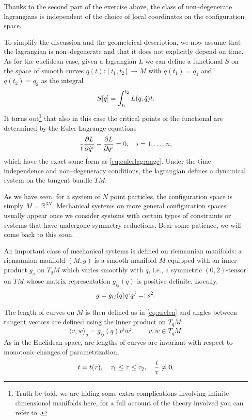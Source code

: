 \documentclass[english,fontsize=11pt,paper=a5,oneside]{scrbook}
\newcommand{\R}{\mathbb{R}}
\newcommand{\lag}{\langle}
\newcommand{\rag}{\rangle}
\let\d\relax
\DeclareMathOperator{\d}{d}
\theoremstyle{definition}
\begin{document}
Thanks to the second part of the exercise above, the class of non--degenerate lagrangians is  independent of the choice of local coordinates on the configuration space.

To simplify the discussion and the geometrical description, we now assume that the lagrangian is non--degenerate and that it does not explicitly depend on time.
As for the euclidean case, given a lagrangian $L$ we can define a functional $S$ on the space of smooth curves $q(t): [t_1,t_2] \to M$ with $q(t_1) = q_1$ and $q(t_2) = q_2$ as the integral
\begin{equation}
    S[q] = \int_{t_1}^{t_2} L(q,\dot q) \d t.
\end{equation}
It turns out\footnote{Truth be told, we are hiding some extra complications involving infinite dimensional manifolds here, for a full account of the theory involved you can refer to \cite[Chapters 7 and 8]{book:marsdenratiu}.} that also in this case the critical points of the functional are determined by the Euler-Lagrange equations
\begin{equation}
    \frac{\d}{\d t}\frac{\partial L}{\partial \dot q^i} - \frac{\partial L}{\partial q^i} =0, \quad i=1,\ldots,n,
\end{equation}
which have the exact same form as \eqref{eq:eulerlagrange}.
Under the time-independence and non--degeneracy conditions, the lagrangian defines a dynamical system on the tangent bundle $TM$.

As we have seen, for a system of $N$ point particles, the configuration space is simply $M=\R^{3N}$. Mechanical systems on more general configuration spaces usually appear once we consider systems with certain types of constraints or systems that have undergone symmetry reductions.
Bear some patience, we will come back to this soon.
\medskip

An important class of mechanical systems is defined on riemannian manifolds: a riemannian manifold $(M, g)$ is a smooth manifold $M$ equipped with an inner product $g_q$ on $T_q M$ which varies smoothly with $q$, i.e., a symmetric $(0,2)$-tensor on $TM$ whose matrix representation $g_{ij}(q)$ is positive definite. Locally,
\begin{equation}
    g = g_{ij}(q) \d q^i \d q^j =: \d s^2.
\end{equation}

The length of curves on $M$ is then defined as in \eqref{eq:arclen} and angles between tangent vectors are defined using the inner product on $T_qM$:
\begin{equation}
    \lag v, w\rag_g = g_{ij}(q) v^i w^j, \qquad v,w\in T_q M.
\end{equation}
As in the Euclidean space, arc lengths of curves are invariant with respect to monotonic changes of parametrization,
\begin{equation}
    t = t(\tau),\quad \tau_1\leq \tau\leq \tau_2, \quad \frac{\d t}{\d \tau}\neq 0.
\end{equation}
\end{document}
